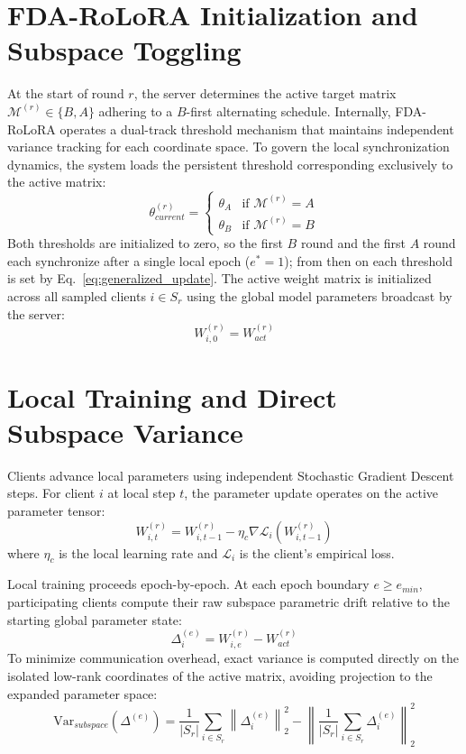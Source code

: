 \section{FDA-RoLoRA Initialization and Subspace Toggling}
At the start of round $r$, the server determines the active target matrix $\mathcal{M}^{(r)} \in \{B, A\}$ adhering to a $B$-first alternating schedule. Internally, FDA-RoLoRA operates a dual-track threshold mechanism that maintains independent variance tracking for each coordinate space. To govern the local synchronization dynamics, the system loads the persistent threshold corresponding exclusively to the active matrix:
\begin{equation}
    \theta_{current}^{(r)} = \begin{cases} 
    \theta_A & \text{if } \mathcal{M}^{(r)} = A \\ 
    \theta_B & \text{if } \mathcal{M}^{(r)} = B 
    \end{cases}
    \label{eq:active_threshold}
\end{equation}
Both thresholds are initialized to zero, so the first $B$ round and the first $A$ round each synchronize after a single local epoch ($e^* = 1$); from then on each threshold is set by Eq.~\ref{eq:generalized_update}. The active weight matrix is initialized across all sampled clients $i \in S_r$ using the global model parameters broadcast by the server:
\begin{equation}
    W_{i,0}^{(r)} = W_{act}^{(r)}
    \label{eq:client_init}
\end{equation}

\section{Local Training and Direct Subspace Variance}
Clients advance local parameters using independent Stochastic Gradient Descent \cite{robbins1951stochastic} steps. For client $i$ at local step $t$, the parameter update operates on the active parameter tensor:
\begin{equation}
    W_{i,t}^{(r)} = W_{i,t-1}^{(r)} - \eta_c \nabla \mathcal{L}_i(W_{i,t-1}^{(r)})
    \label{eq:local_sgd}
\end{equation}
where $\eta_c$ is the local learning rate and $\mathcal{L}_i$ is the client's empirical loss.

Local training proceeds epoch-by-epoch. At each epoch boundary $e \ge e_{min}$, participating clients compute their raw subspace parametric drift relative to the starting global parameter state:
\begin{equation}
    \Delta_i^{(e)} = W_{i,e}^{(r)} - W_{act}^{(r)}
    \label{eq:drift}
\end{equation}
To minimize communication overhead, exact variance is computed directly on the isolated low-rank coordinates of the active matrix, avoiding projection to the expanded parameter space:
\begin{equation}
    \text{Var}_{subspace}(\Delta^{(e)}) = \frac{1}{|S_r|} \sum_{i \in S_r} \left\| \Delta_i^{(e)} \right\|_2^2 - \left\| \frac{1}{|S_r|} \sum_{i \in S_r} \Delta_i^{(e)} \right\|_2^2
    \label{eq:subspace_var}
\end{equation}

